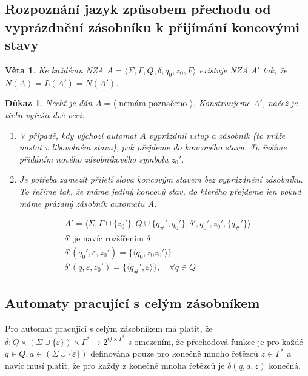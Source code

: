 \documentclass[10pt, a4paper, titlepage]{article}
\theoremstyle{note}
\newtheorem{dukaz}{Důkaz}
\newtheorem{veta}{Věta}
\begin{document}
\subsection{Rozpoznání jazyk způsobem přechodu od vyprázdnění zásobníku k přijímání koncovými stavy}
\begin{veta}
Ke každému NZA $A = \langle \Sigma, \Gamma, Q, \delta, q_0, z_0, F \rangle$ existuje NZA $A'$ tak, že $N(A) = L(A') = N(A')$.
\end{veta}
\begin{dukaz}
Něchť je dán $A = \langle \text{ nemám poznačeno } \rangle$. Konstruujeme $A'$, načež je třeba vyřešit dvě věci:
\begin{enumerate}
\item
V případě, kdy výchozí automat $A$ vyprázdnil vstup a zásobník (to může nastat v libovolném stavu), pak přejdeme do koncového
stavu. To řešíme přidáním nového zásobníkového symbolu $z_0'$.

\item
Je potřeba zamezit přijetí slova koncovým stavem bez vyprázdnění zásobníku. To řešíme tak, že máme jediný koncový stav, do kterého přejdeme
jen pokud máme prázdný zásobník automatu $A$.
\end{enumerate}
\begin{gather*}
A' = \langle \Sigma, \Gamma \cup \lbrace z_0' \rbrace, Q \cup \lbrace q_\#', q_0' \rbrace, \delta', q_0', z_0', \lbrace q_\#' \rbrace \rangle \\
\delta' \text{ je navíc rozšířením } \delta \\
\delta'(q_0', \varepsilon, z_0') = \lbrace \langle q_0, z_0z_0' \rangle \rbrace \\
\delta'(q, \varepsilon, z_0') = \lbrace \langle q_\#', \varepsilon \rangle \rbrace, \quad \forall q \in Q
\end{gather*}
\end{dukaz}

\subsection{Automaty pracující s celým zásobníkem}
Pro automat pracující s celým zásobníkem má platit, že $\delta : Q \times (\Sigma \cup \lbrace \varepsilon \rbrace) \times \Gamma^*
 \rightarrow 2^{Q \times \Gamma^*}$ s omezením, že přechodová funkce je pro každé $q \in Q, a \in (\Sigma \cup \lbrace \varepsilon \rbrace)$ definována
pouze pro konečně mnoho řetězců $z \in \Gamma^*$ a navíc musí platit, že pro každý z konečně mnoha řetězců je $\delta(q, a, z)$ konečná.
\end{document}
